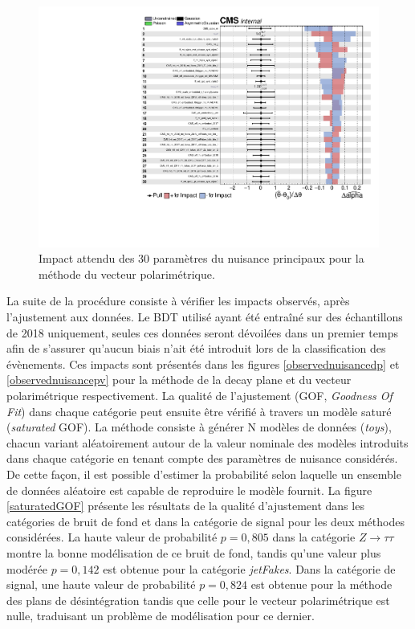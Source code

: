 \begin{figure}[]
        \centering
        \includegraphics[scale=0.6]{Chapitre7/Images/impactspvblind.pdf} 
        \vspace{0.5ex}
    \caption{Impact attendu des 30 paramètres du nuisance principaux pour la méthode du vecteur polarimétrique.}
    \label{expectednuisancedp}
\end{figure}

La suite de la procédure consiste à vérifier les impacts observés, après l'ajustement aux données. Le BDT utilisé ayant été entraîné sur des échantillons de 2018 uniquement, seules ces données seront dévoilées dans un premier temps afin de s'assurer qu'aucun biais n'ait été introduit lors de la classification des évènements. Ces impacts sont présentés dans les figures \ref{observednuisancedp} et \ref{observednuisancepv} pour la méthode de la decay plane et du vecteur polarimétrique respectivement. La qualité de l'ajustement (GOF, \textit{Goodness Of Fit}) dans chaque catégorie peut ensuite être vérifié à travers un modèle saturé (\textit{saturated} GOF). La méthode consiste à générer N modèles de données (\textit{toys}), chacun variant aléatoirement autour de la valeur nominale des modèles introduits dans chaque catégorie en tenant compte des paramètres de nuisance considérés. De cette façon, il est possible d'estimer la probabilité selon laquelle un ensemble de données aléatoire est capable de reproduire le modèle fournit. La figure \ref{saturatedGOF} présente les résultats de la qualité d'ajustement dans les catégories de bruit de fond et dans la catégorie de signal pour les deux méthodes considérées. La haute valeur de probabilité $p=0,805$ dans la catégorie $Z\to\tau\tau$ montre la bonne modélisation de ce bruit de fond, tandis qu'une valeur plus modérée $p=0,142$ est obtenue pour la catégorie \textit{jetFakes}. Dans la catégorie de signal, une haute valeur de probabilité $p=0,824$ est obtenue pour la méthode des plans de désintégration tandis que celle pour le vecteur polarimétrique est nulle, traduisant un problème de modélisation pour ce dernier.


